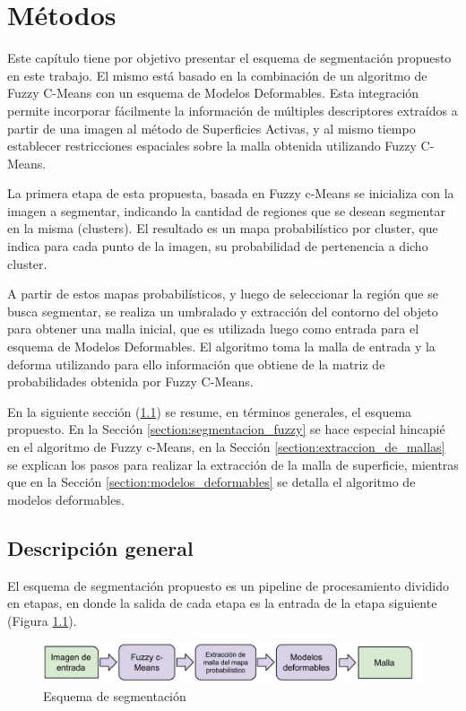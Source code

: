 \chapter{Métodos}\label{chapter:metodos}
Este capítulo tiene por objetivo presentar el esquema de segmentación propuesto en este trabajo.  El mismo está basado en la combinación de un algoritmo de Fuzzy C-Means con un esquema de Modelos Deformables. Esta integración permite incorporar fácilmente la información de múltiples descriptores extraídos a partir de una imagen al método de Superficies Activas, y al mismo tiempo establecer restricciones espaciales sobre la malla obtenida utilizando Fuzzy C-Means.
 
La primera etapa de esta propuesta, basada en Fuzzy c-Means se inicializa con la imagen a segmentar, indicando la cantidad de regiones que se desean segmentar en la misma (clusters). El resultado es un mapa probabilístico por cluster, que indica para cada punto de la imagen, su probabilidad de pertenencia a dicho cluster.

A partir de estos mapas probabilísticos, y luego de seleccionar la región que se busca segmentar, se realiza un umbralado y extracción del contorno del objeto para obtener una malla inicial, que es utilizada luego como entrada para el esquema de Modelos Deformables. El algoritmo toma la malla de entrada y la deforma utilizando para ello información que obtiene de la matriz de probabilidades obtenida por Fuzzy C-Means.

En la siguiente sección (\ref{section:descripcion_general}) se resume, en términos generales, el esquema propuesto. En la Sección \ref{section:segmentacion_fuzzy} se hace especial hincapié en el algoritmo de Fuzzy c-Means, en la Sección \ref{section:extraccion_de_mallas} se explican los pasos para realizar la extracción de la malla de superficie, mientras que en la Sección \ref{section:modelos_deformables} se detalla el algoritmo de modelos deformables.

\section{Descripción general}\label{section:descripcion_general}
El esquema de segmentación propuesto es un pipeline de procesamiento dividido en etapas, en donde la salida de cada etapa es la entrada de la etapa siguiente (Figura \ref{fig:esquema_de_segmentacion}).


\begin{figure}[H]
	\centering
	\includegraphics[scale=0.3]{images/pipeline_de_segmentacion.jpg}
	\caption{Esquema de segmentación}
	\label{fig:esquema_de_segmentacion}
\end{figure}

